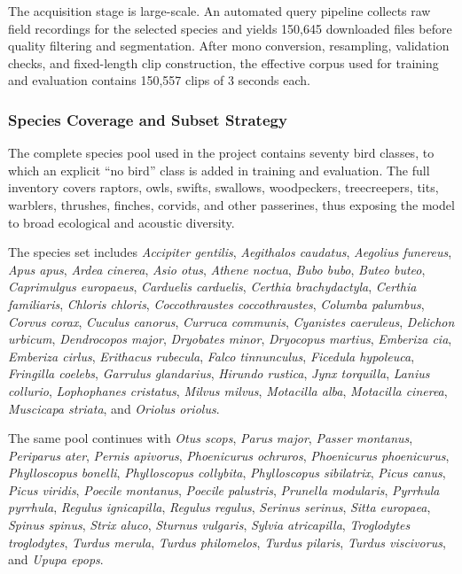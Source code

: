 \documentclass[a4paper,singleside,12pt]{report} %
\begin{document}
	The acquisition stage is large-scale. An automated query pipeline collects raw field recordings for the selected species and yields 150,645 downloaded files before quality filtering and segmentation. After mono conversion, resampling, validation checks, and fixed-length clip construction, the effective corpus used for training and evaluation contains 150,557 clips of 3 seconds each.

	\subsubsection{Species Coverage and Subset Strategy}
	The complete species pool used in the project contains seventy bird classes, to which an explicit ``no bird'' class is added in training and evaluation. The full inventory covers raptors, owls, swifts, swallows, woodpeckers, treecreepers, tits, warblers, thrushes, finches, corvids, and other passerines, thus exposing the model to broad ecological and acoustic diversity.

	The species set includes \emph{Accipiter gentilis}, \emph{Aegithalos caudatus}, \emph{Aegolius funereus}, \emph{Apus apus}, \emph{Ardea cinerea}, \emph{Asio otus}, \emph{Athene noctua}, \emph{Bubo bubo}, \emph{Buteo buteo}, \emph{Caprimulgus europaeus}, \emph{Carduelis carduelis}, \emph{Certhia brachydactyla}, \emph{Certhia familiaris}, \emph{Chloris chloris}, \emph{Coccothraustes coccothraustes}, \emph{Columba palumbus}, \emph{Corvus corax}, \emph{Cuculus canorus}, \emph{Curruca communis}, \emph{Cyanistes caeruleus}, \emph{Delichon urbicum}, \emph{Dendrocopos major}, \emph{Dryobates minor}, \emph{Dryocopus martius}, \emph{Emberiza cia}, \emph{Emberiza cirlus}, \emph{Erithacus rubecula}, \emph{Falco tinnunculus}, \emph{Ficedula hypoleuca}, \emph{Fringilla coelebs}, \emph{Garrulus glandarius}, \emph{Hirundo rustica}, \emph{Jynx torquilla}, \emph{Lanius collurio}, \emph{Lophophanes cristatus}, \emph{Milvus milvus}, \emph{Motacilla alba}, \emph{Motacilla cinerea}, \emph{Muscicapa striata}, and \emph{Oriolus oriolus}.

	The same pool continues with \emph{Otus scops}, \emph{Parus major}, \emph{Passer montanus}, \emph{Periparus ater}, \emph{Pernis apivorus}, \emph{Phoenicurus ochruros}, \emph{Phoenicurus phoenicurus}, \emph{Phylloscopus bonelli}, \emph{Phylloscopus collybita}, \emph{Phylloscopus sibilatrix}, \emph{Picus canus}, \emph{Picus viridis}, \emph{Poecile montanus}, \emph{Poecile palustris}, \emph{Prunella modularis}, \emph{Pyrrhula pyrrhula}, \emph{Regulus ignicapilla}, \emph{Regulus regulus}, \emph{Serinus serinus}, \emph{Sitta europaea}, \emph{Spinus spinus}, \emph{Strix aluco}, \emph{Sturnus vulgaris}, \emph{Sylvia atricapilla}, \emph{Troglodytes troglodytes}, \emph{Turdus merula}, \emph{Turdus philomelos}, \emph{Turdus pilaris}, \emph{Turdus viscivorus}, and \emph{Upupa epops}.
\end{document}
